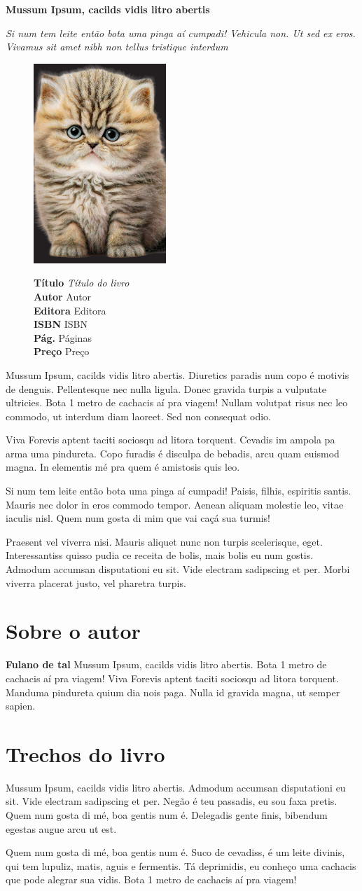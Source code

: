 \documentclass[11pt,a4paper]{article}
\newcommand{\maintitle}[1]{%
\noindent\begin{minipage}{11cm}
{\LARGE\bfseries #1}\bigskip
\end{minipage}
}
\newcommand{\linhafina}[1]{%
\noindent\begin{minipage}{11cm}
{\itshape #1}
\end{minipage}
}
\newcommand{\bookinfo}[6]{%
\begin{figure}
\includegraphics[width=50mm]{./THUMB.pdf}
\smallskip

\textbf{Título} \textit{#1}\\
\textbf{Autor} #2\\
\textbf{Editora} #3\\
\textbf{ISBN} #4\\
\textbf{Pág.} #5\\
\textbf{Preço} #6
\end{figure}
}
\begin{document}
\maintitle{Mussum Ipsum, cacilds vidis litro abertis}

\linhafina{Si num tem leite então bota uma pinga aí cumpadi! Vehicula non. Ut sed ex eros. Vivamus sit amet nibh non tellus tristique interdum}

\vspace{1cm}

\bookinfo{Título do livro}{Autor}{Editora}{ISBN}{Páginas}{Preço}

\noindent Mussum Ipsum, cacilds vidis litro abertis. Diuretics paradis num copo é motivis de denguis. Pellentesque nec nulla ligula. Donec gravida turpis a vulputate ultricies. Bota 1 metro de cachacis aí pra viagem! Nullam volutpat risus nec leo commodo, ut interdum diam laoreet. Sed non consequat odio.

Viva Forevis aptent taciti sociosqu ad litora torquent. Cevadis im ampola pa arma uma pindureta. Copo furadis é disculpa de bebadis, arcu quam euismod magna. In elementis mé pra quem é amistosis quis leo.

Si num tem leite então bota uma pinga aí cumpadi! Paisis, filhis, espiritis santis. Mauris nec dolor in eros commodo tempor. Aenean aliquam molestie leo, vitae iaculis nisl. Quem num gosta di mim que vai caçá sua turmis!

Praesent vel viverra nisi. Mauris aliquet nunc non turpis scelerisque, eget. Interessantiss quisso pudia ce receita de bolis, mais bolis eu num gostis. Admodum accumsan disputationi eu sit. Vide electram sadipscing et per. Morbi viverra placerat justo, vel pharetra turpis.

\section{Sobre o autor}

\textbf{Fulano de tal} Mussum Ipsum, cacilds vidis litro abertis.  Bota 1 metro de cachacis aí pra viagem! Viva Forevis aptent taciti sociosqu ad litora torquent. Manduma pindureta quium dia nois paga. Nulla id gravida magna, ut semper sapien.

\section{Trechos do livro}

Mussum Ipsum, cacilds vidis litro abertis.  Admodum accumsan disputationi eu sit. Vide electram sadipscing et per. Negão é teu passadis, eu sou faxa pretis. Quem num gosta di mé, boa gentis num é. Delegadis gente finis, bibendum egestas augue arcu ut est.

Quem num gosta di mé, boa gentis num é. Suco de cevadiss, é um leite divinis, qui tem lupuliz, matis, aguis e fermentis. Tá deprimidis, eu conheço uma cachacis que pode alegrar sua vidis. Bota 1 metro de cachacis aí pra viagem!
\end{document}
